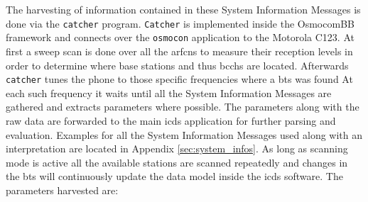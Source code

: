 The harvesting of information contained in these System Information Messages is done via the \texttt{catcher} program.
\texttt{Catcher} is implemented inside the OsmocomBB framework and connects over the \texttt{osmocon} application to the Motorola C123.
At first a sweep scan is done over all the \glspl{arfcn} to measure their reception levels in order to determine where base stations and thus \glspl{bcch} are located.
Afterwards \texttt{catcher} tunes the phone to those specific frequencies where a \gls{bts} was found 
At each such frequency it waits until all the System Information Messages are gathered and extracts parameters where possible.
The parameters along with the raw data are forwarded to the main \gls{icds} application for further parsing and evaluation.
Examples for all the System Information Messages used along with an interpretation are located in Appendix \ref{sec:system_infos}.
As long as scanning mode is active all the available stations are scanned repeatedly and changes in the \gls{bts} will continuously update the data model inside the \gls{icds} software.
The parameters harvested are:
